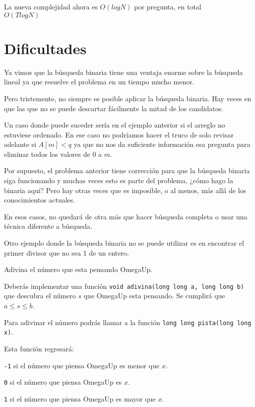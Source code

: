 La nueva complejidad ahora es \(O(logN)\) por pregunta, en total\\ \(O(TlogN)\)

\section*{Dificultades}
Ya vimos que la búsqueda binaria tiene una ventaja enorme sobre la búsqueda lineal ya que resuelve el problema en un tiempo mucho menor.

Pero tristemente, no siempre es posible aplicar la búsqueda binaria. Hay veces en que las que no se puede descartar fácilmente la mitad de los candidatos.

Un caso donde puede suceder sería en el ejemplo anterior si el arreglo no estuviese ordenado. En ese caso no podríamos hacer el truco de solo revisar adelante si \(A[m]<q\) ya que no nos da suficiente información esa pregunta para eliminar todos los valores de \(0\) a \(m\).

Por supuesto, el problema anterior tiene corrección para que la búsqueda binaria siga funcionando y muchas veces esto es parte del problema, ¿cómo hago la binaria aquí? Pero hay otras veces que es imposible, o al menos, más allá de los conocimientos actuales.

En esos casos, no quedará de otra más que hacer búsqueda completa o usar una técnica diferente a búsqueda.

Otro ejemplo donde la búsqueda binaria no se puede utilizar es en encontrar el primer divisor que no sea 1 de un entero.
\newpage


\problemtitle Adivina el número que esta pensando OmegaUp.

Deberás implementar una función \verb|void adivina(long long a, long long b)| que descubra el número \(s\) que OmegaUp esta pensando. Se cumplirá que \(a\leq s\leq b\).

Para adivinar el número podrás llamar a la función \verb|long long pista(long long x)|.

Esta función regresará:
\begin{plimits}
	\item \verb|-1| si el número que piensa OmegaUp es menor que \(x\).
	\item \verb|0| si el número que piensa OmegaUp es \(x\).
	\item \verb|1| si el número que piensa OmegaUp es mayor que \(x\).
\end{plimits} 

